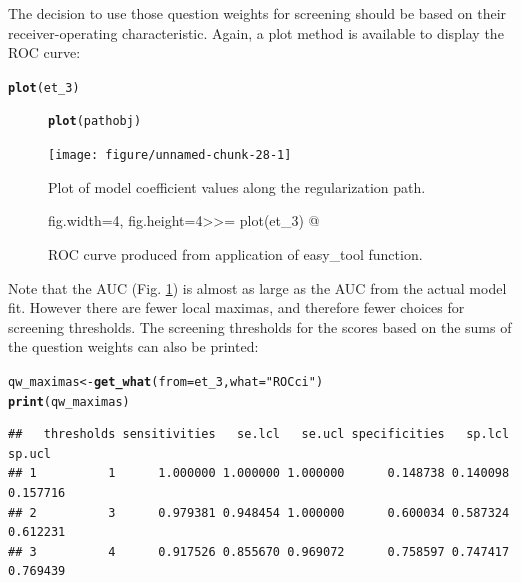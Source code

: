 \documentclass[11pt]{report}\usepackage[]{graphicx}\usepackage[]{xcolor}
\makeatletter
\newcommand{\hlstr}[1]{\textcolor[rgb]{0.192,0.494,0.8}{#1}}%
\newcommand{\hlstd}[1]{\textcolor[rgb]{0.345,0.345,0.345}{#1}}%
\newcommand{\hlkwb}[1]{\textcolor[rgb]{0.69,0.353,0.396}{#1}}%
\newcommand{\hlkwc}[1]{\textcolor[rgb]{0.333,0.667,0.333}{#1}}%
\newcommand{\hlkwd}[1]{\textcolor[rgb]{0.737,0.353,0.396}{\textbf{#1}}}%
\newenvironment{kframe}{%
 \def\at@end@of@kframe{}%
 \ifinner\ifhmode%
  \def\at@end@of@kframe{\end{minipage}}%
  \begin{minipage}{\columnwidth}%
 \fi\fi%
 \def\FrameCommand##1{\hskip\@totalleftmargin \hskip-\fboxsep
 \colorbox{shadecolor}{##1}\hskip-\fboxsep
     \hskip-\linewidth \hskip-\@totalleftmargin \hskip\columnwidth}%
 \MakeFramed {\advance\hsize-\width
   \@totalleftmargin\z@ \linewidth\hsize
   \@setminipage}}%
 {\par\unskip\endMakeFramed%
 \at@end@of@kframe}
\newenvironment{knitrout}{}{} %
\makeatother
\begin{document}
The decision to use those question weights for screening should be
based on their receiver-operating characteristic. Again, a plot method
is available to display the ROC curve:
\begin{knitrout}
\color{fgcolor}\begin{kframe}
\begin{alltt}
\hlkwd{plot}\hlstd{(et_3)}
\end{alltt}
\end{kframe}
\end{knitrout}
\begin{figure}[!h]
  \begin{center}
\begin{knitrout}
\color{fgcolor}\begin{kframe}
\begin{alltt}
\hlkwd{plot}\hlstd{(pathobj)}
\end{alltt}
\end{kframe}
\texttt{[image: figure/unnamed-chunk-28-1]} 
\end{knitrout}
\caption{Plot of model coefficient values along the regularization
  path.}
\label{fig:f1}fig.width=4, fig.height=4>>=
plot(et_3)
@
\caption{ROC curve produced from application of \textsf{easy\_tool}
  function.}
\label{fig:f4}
\end{center}
\end{figure}
Note that the AUC (Fig. \ref{fig:f4}) is almost as large as the AUC
from the actual model fit. However there are fewer local maximas, and
therefore fewer choices for screening thresholds. The screening
thresholds for the scores based on the sums of the question weights
can also be printed:
\begin{knitrout}
\color{fgcolor}\begin{kframe}
\begin{alltt}
\hlstd{qw_maximas} \hlkwb{<-} \hlkwd{get_what}\hlstd{(}\hlkwc{from} \hlstd{= et_3,}  \hlkwc{what} \hlstd{=} \hlstr{"ROCci"} \hlstd{)}
\hlkwd{print}\hlstd{(qw_maximas)}
\end{alltt}
\begin{verbatim}
##   thresholds sensitivities   se.lcl   se.ucl specificities   sp.lcl   sp.ucl
## 1          1      1.000000 1.000000 1.000000      0.148738 0.140098 0.157716
## 2          3      0.979381 0.948454 1.000000      0.600034 0.587324 0.612231
## 3          4      0.917526 0.855670 0.969072      0.758597 0.747417 0.769439
\end{verbatim}
\end{kframe}
\end{knitrout}
\end{document}
